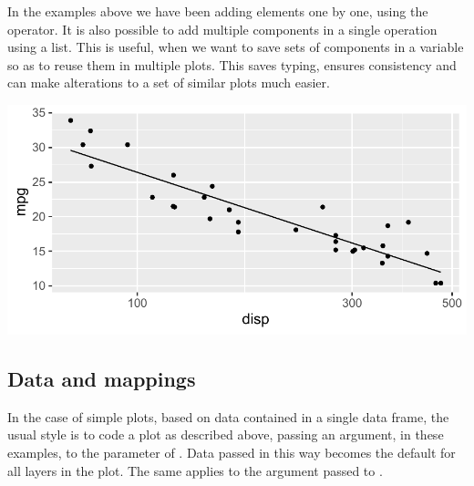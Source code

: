 \documentclass[krantz2]{krantz}\usepackage{knitr}
\begin{document}
\begin{infobox}
  In the examples above we have been adding elements one by one, using the \code{+} operator. It is also possible to add multiple components in a single operation using a list. This is useful, when we want to save sets of components in a variable so as to reuse them in multiple plots. This saves typing, ensures consistency and can make alterations to a set of similar plots much easier.

\begin{knitrout}\footnotesize
{}\color{fgcolor}\begin{kframe}
\begin{alltt}
 \hlkwb{<-} \hlstd{(}
  \hlstd{(} \hlstd{=} \hlstd{,}  \hlstd{=} \hlstd{,}   \hlopt{~} 
  \hlstd{())}
\end{alltt}
\end{kframe}
\end{knitrout}

\begin{knitrout}\footnotesize
{}\color{fgcolor}\begin{kframe}
\begin{alltt}
 \hlopt{+} 
\end{alltt}
\end{kframe}

{\centering \includegraphics[width=.7\textwidth]{figure/pos-ggplot-objects-info-02-1}

}



\end{knitrout}

\end{infobox}

\subsection{Data and mappings}
In the case of simple plots, based on data contained in a single data frame, the usual style is to code a plot as described above, passing an argument,  in these examples, to the  parameter of . Data passed in this way becomes the default for all layers in the plot. The same applies to the argument passed to .
\end{document}

